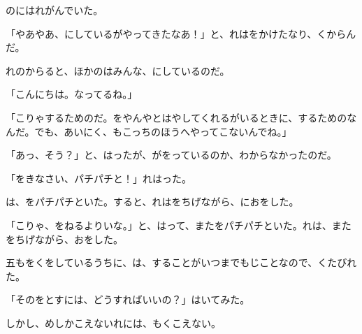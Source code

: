 のにはれがんでいた。

「やあやあ、にしているがやってきたなあ！」と、れはをかけたなり、くからんだ。

れのからると、ほかのはみんな、にしているのだ。

「こんにちは。なってるね。」

「こりゃするためのだ。をやんやとはやしてくれるがいるときに、するためのなんだ。でも、あいにく、もこっちのほうへやってこないんでね。」

「あっ、そう？」と、はったが、がをっているのか、わからなかったのだ。

「をきなさい、パチパチと！」れはった。

は、をパチパチといた。すると、れはをちげながら、におをした。

「こりゃ、をねるよりいな。」と、はって、またをパチパチといた。れは、またをちげながら、おをした。

五もをくをしているうちに、は、することがいつまでもじことなので、くたびれた。

「そのをとすには、どうすればいいの？」はいてみた。

しかし、めしかこえないれには、もくこえない。


